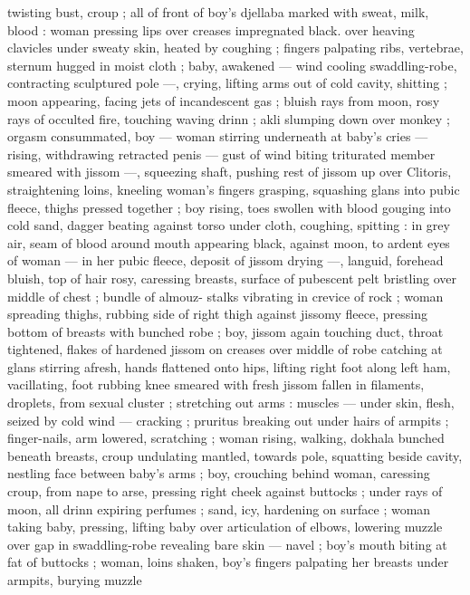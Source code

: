 twisting bust, croup ; all of front of boy's djellaba marked with sweat,
milk, blood : woman pressing lips over creases impregnated black.
over heaving clavicles under sweaty skin, heated by coughing ;
fingers palpating ribs, vertebrae, sternum hugged in moist cloth ;
baby, awakened --- wind cooling swaddling-robe, contracting
sculptured pole ---, crying, lifting arms out of cold cavity, shitting ;
moon appearing, facing jets of incandescent gas ; bluish rays from
moon, rosy rays of occulted fire, touching waving drinn ; akli
slumping down over monkey ; orgasm consummated, boy --- woman
stirring underneath at baby’s cries --- rising, withdrawing retracted
penis --- gust of wind biting triturated member smeared with jissom
---, squeezing shaft, pushing rest of jissom up over Clitoris,
straightening loins, kneeling woman's fingers grasping, squashing
glans into pubic fleece, thighs pressed together ; boy rising, toes
swollen with blood gouging into cold sand, dagger beating against
torso under cloth, coughing, spitting : in grey air, seam of blood
around mouth appearing black, against moon, to ardent eyes of
woman --- in her pubic fleece, deposit of jissom drying ---, languid,
forehead bluish, top of hair rosy, caressing breasts, surface of
pubescent pelt bristling over middle of chest ; bundle of almouz-
stalks vibrating in crevice of rock ; woman spreading thighs, rubbing
side of right thigh against jissomy fleece, pressing bottom of breasts
with bunched robe ; boy, jissom again touching duct, throat
tightened, flakes of hardened jissom on creases over middle of robe
catching at glans stirring afresh, hands flattened onto hips, lifting
right foot along left ham, vacillating, foot rubbing knee smeared with
fresh jissom fallen in filaments, droplets, from sexual cluster ;
stretching out arms : muscles --- under skin, flesh, seized by cold
wind --- cracking ; pruritus breaking out under hairs of armpits ;
finger-nails, arm lowered, scratching ; woman rising, walking,
dokhala bunched beneath breasts, croup undulating mantled,
towards pole, squatting beside cavity, nestling face between baby’s
arms ; boy, crouching behind woman, caressing croup, from nape to
arse, pressing right cheek against buttocks ; under rays of moon, all
drinn expiring perfumes ; sand, icy, hardening on surface ; woman
taking baby, pressing, lifting baby over articulation of elbows,
lowering muzzle over gap in swaddling-robe revealing bare skin ---
navel ; boy's mouth biting at fat of buttocks ; woman, loins shaken,
boy's fingers palpating her breasts under armpits, burying muzzle
